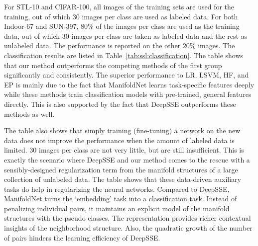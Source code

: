 \documentclass{bmvc2k}
\begin{document}


For STL-10 and CIFAR-100, all images of the training sets are used for the training, out of which $30$ images per class are used as labeled data.  
For both Indoor-67 and SUN-397, $80\%$ of the images per class are used as the
training data, out of which $30$ images per class are taken as labeled
data and the rest as unlabeled data. The performance is reported
on the other $20\%$ images. 
The classification results are listed in
Table~\ref{tab:ssl:classification}.  The table shows that our method
outperforms the competing methods of the first group significantly and consistently. The
superior performance to LR, LSVM, HF, and EP is mainly due to the fact
that ManifoldNet learns task-specific features deeply while these
methods train classification models with pre-trained, general features
directly. This is also supported by the fact that DeepSSE outperforms
these methods as well. 

The table also shows that simply
training (fine-tuning) a network on the new data does not improve the
performance when the amount of labeled data is limited. $30$ images
per class are not very little, but are still insufficient. This is exactly the scenario where DeepSSE and our
method comes to the rescue with a sensibly-designed regularization term from
the manifold structures of a large collection of unlabeled data. The
table shows that these data-driven auxiliary tasks do help in
regularizing the neural networks. 
Compared to DeepSSE, ManifoldNet turns the `embedding' task into a classification
task. Instead of penalizing individual pairs, it maintains an
explicit model of the manifold structures with the pseudo
classes. The representation provides richer contextual insights of the
neighborhood structure. Also, the quadratic growth of the number of
pairs hinders the learning efficiency of DeepSSE. 
\end{document}
